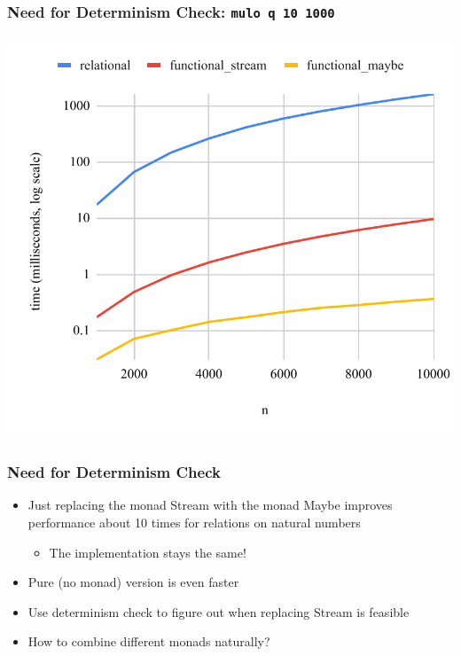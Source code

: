 \documentclass[xcolor=table]{beamer}
\begin{document}
\begin{frame}[fragile]
  \frametitle{Need for Determinism Check: \lstinline[basicstyle=\Large]{mulo q 10 1000}}
  \begin{center}
    \includegraphics[height=0.85\textheight]{figures/maybe.pdf}
  \end{center}
\end{frame}

\begin{frame}[fragile]
  \frametitle{Need for Determinism Check}
  \begin{itemize}
    \item Just replacing the monad Stream with the monad Maybe improves performance about 10 times for relations on natural numbers
    \begin{itemize}
      \item The implementation stays the same!
    \end{itemize}
    \item Pure (no monad) version is even faster
    \item Use determinism check to figure out when replacing Stream is feasible
    \item How to combine different monads naturally?
  \end{itemize}
\end{frame}
\end{document}
